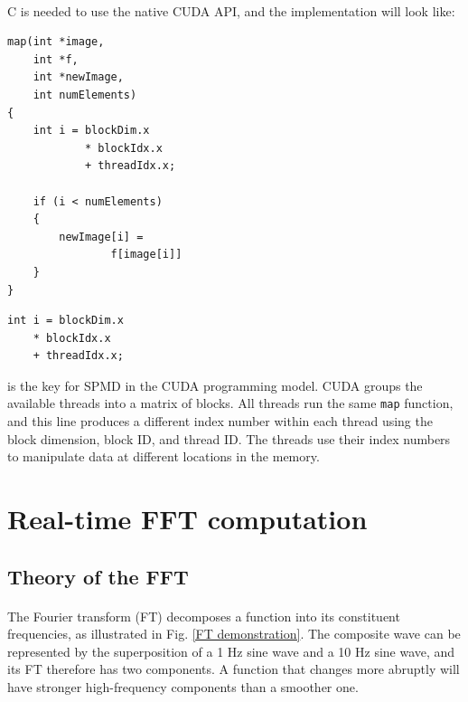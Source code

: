 \documentclass[12pt, twocolumn]{report}
\begin{document}
\paragraph{}
C is needed to use the native CUDA API, and the implementation will look like:
\begin{lstlisting}
map(int *image, 
    int *f,
    int *newImage, 
    int numElements) 
{
    int i = blockDim.x
            * blockIdx.x 
            + threadIdx.x;

    if (i < numElements) 
    {
        newImage[i] = 
                f[image[i]]
    }
}
\end{lstlisting}
\begin{lstlisting}
int i = blockDim.x
    * blockIdx.x 
    + threadIdx.x;
\end{lstlisting}
is the key for SPMD in the CUDA programming model. CUDA groups the available threads into a matrix of blocks. All threads run the same \lstinline{map} function, and this line produces a different index number within each thread using the block dimension, block ID, and thread ID. The threads use their index numbers to manipulate data at different locations in the memory.

\section{Real-time FFT computation}
\subsection{Theory of the FFT}
\paragraph{}
The Fourier transform (FT) decomposes a function into its constituent frequencies, as illustrated in Fig. \ref{FT demonstration}. The composite wave can be represented by the superposition of a 1 Hz sine wave and a 10 Hz sine wave, and its FT therefore has two components. A function that changes more abruptly will have stronger high-frequency components than a smoother one.
\end{document}
